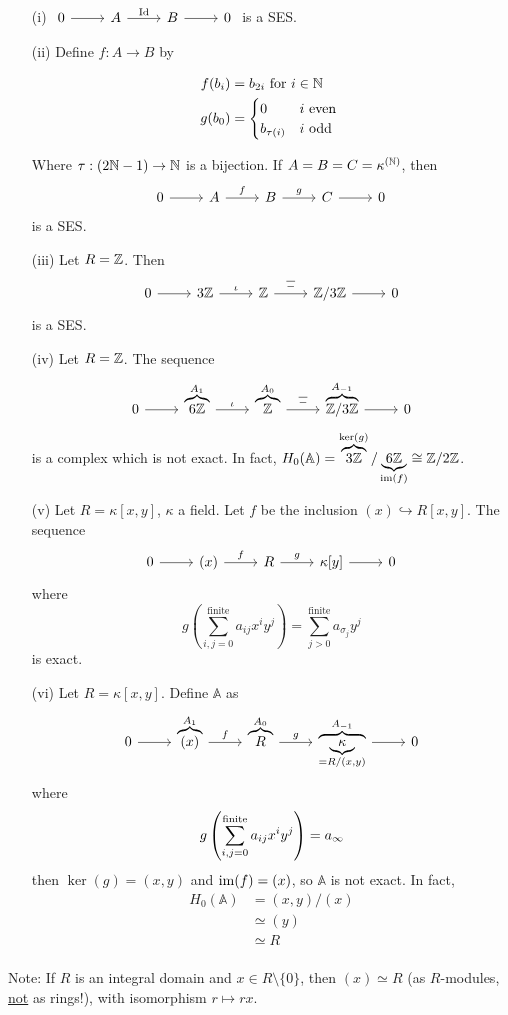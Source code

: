 \documentclass[x11names,reqno,14pt]{extarticle}
\newcommand{\A}{\mathbb{A}}
\begin{document}
\begin{itemize}
\item[(i)] $\begin{tikzcd} 0\ar[r]&A\ar[r, "\Id"]&B\ar[r]&0 \end{tikzcd}$ is a SES.
\item[(ii)] Define $f:A\to B$ by 

\begin{align*}
f(b_i) & = b_{2i} \text{ for }i\in \mathbb{N} \\
g(b_0) & = \begin{cases} 0 & i\text{ even } \\ b_{\tau(i)} & i\text{ odd } \end{cases}
\end{align*}

Where $\tau:(2\mathbb{N}-1)\to\mathbb{N}$ is a bijection. If $A = B = C = \kappa^{(\mathbb{N})}$, then 
\[
\exactshort{A}{f}{B}{g}{C}
\]
is a SES. 
\item[(iii)] Let $R = \mathbb{Z}$. Then 
\[
\exactshort{3\Z}{\iota}{\Z}{\bar{-}}{\Z/3\Z}
\]
is a SES. 
\item[(iv)] Let $R = \mathbb{Z}$. The sequence 
\[
\exactshort{\overbrace{6\Z}^{A_1}}{\iota}{\overbrace{\Z}^{A_0}}{\bar{-}}{\overbrace{\Z/3\Z}^{A_{-1}}}
\]
is a complex which is not exact. In fact, $H_0(\A) = \overbrace{3\Z}^{\ker(g)}/\underbrace{6\Z}_{\im(f)} \cong \Z/2\Z$. 

\item[(v)] Let $R = \kappa[x, y]$, $\kappa$ a field. Let $f$ be the inclusion $(x)\hookrightarrow R[x, y]$. The sequence
\[
\exactshort{(x)}{f}{R}{g}{\kappa[y]}
\]
where
\[
g\left(\sum_{i, j = 0}^{\text{finite}}a_{ij}x^iy^j\right) = \sum_{j > 0}^{\text{finite}}a_{\sigma_j}y^j
\]
is exact. 

\item[(vi)] Let $R = \kappa[x, y]$. Define $\A$ as
\[
\exactshort{\overbrace{(x)}^{A_1}}{f}{\overbrace{R}^{A_0}}{g}{\overbrace{\underbrace{\kappa}_{=R/(x, y)}}^{A_{-1}}}
\]
where 
\[
g\left(\sum_{i, j = 0}^{\text{finite}}a_{ij}x^iy^j\right) = a_{\infty}
\]
then $\ker(g) = (x, y)$ and $\operatorname{\mathrm{im}}(f) = (x)$, so $\A$ is not exact. In fact, 
\begin{align*}
H_0(\A) & = (x, y)/(x) \\
		  & \simeq (y) \\
		  & \simeq R \\
\end{align*}


\end{itemize}

Note: If $R$ is an integral domain and $x\in R\setminus\{0\}$, then $(x)\simeq R$ (as $R$-modules, \underline{not} as rings!), with isomorphism $r\mapsto rx$. 
\end{document}
